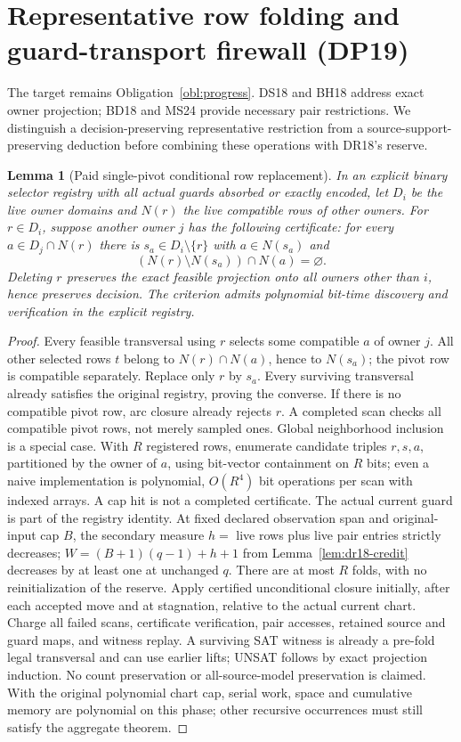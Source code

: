 \documentclass[11pt]{article}
\newtheorem{lemma}[theorem]{Lemma}
\begin{document}
\section{Representative row folding and guard-transport firewall (DP19)}\label{sec:dp19}
The target remains Obligation~\ref{obl:progress}. DS18 and BH18 address exact owner projection; BD18 and MS24 provide necessary pair restrictions. We distinguish a decision-preserving representative restriction from a source-support-preserving deduction before combining these operations with DR18's reserve.
\begin{lemma}[Paid single-pivot conditional row replacement]\label{lem:dp19-fold}
In an explicit binary selector registry with all actual guards absorbed or exactly encoded, let $D_i$ be the live owner domains and $N(r)$ the live compatible rows of other owners. For $r\in D_i$, suppose another owner $j$ has the following certificate: for every $a\in D_j\cap N(r)$ there is $s_a\in D_i\setminus\{r\}$ with $a\in N(s_a)$ and
\[
 (N(r)\setminus N(s_a))\cap N(a)=\varnothing.
\]
Deleting $r$ preserves the exact feasible projection onto all owners other than $i$, hence preserves decision. The criterion admits polynomial bit-time discovery and verification in the explicit registry.
\end{lemma}
\begin{proof}
Every feasible transversal using $r$ selects some compatible $a$ of owner $j$. All other selected rows $t$ belong to $N(r)\cap N(a)$, hence to $N(s_a)$; the pivot row is compatible separately. Replace only $r$ by $s_a$. Every surviving transversal already satisfies the original registry, proving the converse. If there is no compatible pivot row, arc closure already rejects $r$. A completed scan checks all compatible pivot rows, not merely sampled ones. Global neighborhood inclusion is a special case. With $R$ registered rows, enumerate candidate triples $r,s,a$, partitioned by the owner of $a$, using bit-vector containment on $R$ bits; even a naive implementation is polynomial, $O(R^4)$ bit operations per scan with indexed arrays. A cap hit is not a completed certificate. The actual current guard is part of the registry identity.
At fixed declared observation span and original-input cap $B$, the secondary measure $h=$ live rows plus live pair entries strictly decreases; $W=(B+1)(q-1)+h+1$ from Lemma~\ref{lem:dr18-credit} decreases by at least one at unchanged $q$. There are at most $R$ folds, with no reinitialization of the reserve. Apply certified unconditional closure initially, after each accepted move and at stagnation, relative to the actual current chart. Charge all failed scans, certificate verification, pair accesses, retained source and guard maps, and witness replay. A surviving SAT witness is already a pre-fold legal transversal and can use earlier lifts; UNSAT follows by exact projection induction. No count preservation or all-source-model preservation is claimed. With the original polynomial chart cap, serial work, space and cumulative memory are polynomial on this phase; other recursive occurrences must still satisfy the aggregate theorem.
\end{proof}
\end{document}

